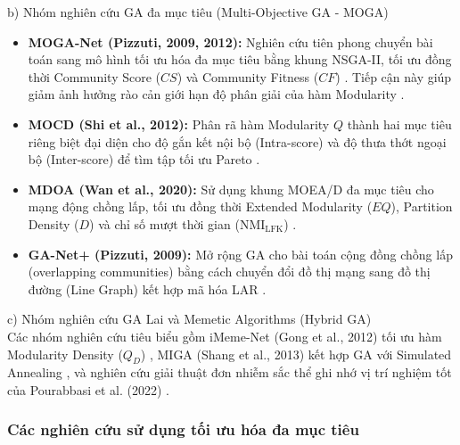 \documentclass[14pt,a4paper]{extarticle}
\begin{document}
\noindent b) Nhóm nghiên cứu GA đa mục tiêu (Multi-Objective GA - MOGA)
\begin{itemize}
    \item \textbf{MOGA-Net (Pizzuti, 2009, 2012):} Nghiên cứu tiên phong chuyển bài toán sang mô hình tối ưu hóa đa mục tiêu bằng khung NSGA-II, tối ưu đồng thời Community Score ($CS$) và Community Fitness ($CF$) \cite{Bedi2016}. Tiếp cận này giúp giảm ảnh hưởng rào cản giới hạn độ phân giải của hàm Modularity \cite{Baraa2021}.
    \item \textbf{MOCD (Shi et al., 2012):} Phân rã hàm Modularity $Q$ thành hai mục tiêu riêng biệt đại diện cho độ gắn kết nội bộ (Intra-score) và độ thưa thớt ngoại bộ (Inter-score) để tìm tập tối ưu Pareto \cite{Baraa2021}.
    \item \textbf{MDOA (Wan et al., 2020):} Sử dụng khung MOEA/D đa mục tiêu cho mạng động chồng lấp, tối ưu đồng thời Extended Modularity ($EQ$), Partition Density ($D$) và chỉ số mượt thời gian ($\text{NMI}_{\text{LFK}}$) \cite{Wan2020}.
    \item \textbf{GA-Net+ (Pizzuti, 2009):} Mở rộng GA cho bài toán cộng đồng chồng lấp (overlapping communities) bằng cách chuyển đổi đồ thị mạng sang đồ thị đường (Line Graph) kết hợp mã hóa LAR \cite{Baraa2021, Bedi2016}.
\end{itemize}

\noindent c) Nhóm nghiên cứu GA Lai và Memetic Algorithms (Hybrid GA)
\\
Các nhóm nghiên cứu tiêu biểu gồm iMeme-Net (Gong et al., 2012) tối ưu hàm Modularity Density ($Q_D$) \cite{Gong2012Memetic}, MIGA (Shang et al., 2013) kết hợp GA với Simulated Annealing \cite{Chen2019}, và nghiên cứu giải thuật đơn nhiễm sắc thể ghi nhớ vị trí nghiệm tốt của Pourabbasi et al. (2022) \cite{Pourabbasi2022}.

\subsubsection{Các nghiên cứu sử dụng tối ưu hóa đa mục tiêu}
\end{document}

